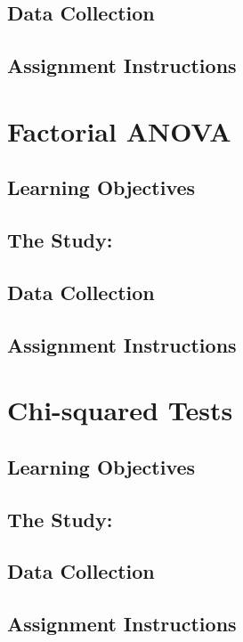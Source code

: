 \documentclass[
]{book}
\begin{document}
\hypertarget{anova-data}{%
\section{Data Collection}\label{anova-data}}

\hypertarget{anova-assignment}{%
\section{Assignment Instructions}\label{anova-assignment}}

\hypertarget{fanova}{%
\chapter{Factorial ANOVA}\label{fanova}}

\hypertarget{fanova-learning-objectives}{%
\section{Learning Objectives}\label{fanova-learning-objectives}}

\hypertarget{fanova-study}{%
\section{The Study:}\label{fanova-study}}

\hypertarget{fanova-data}{%
\section{Data Collection}\label{fanova-data}}

\hypertarget{fanova-assignment}{%
\section{Assignment Instructions}\label{fanova-assignment}}

\hypertarget{chisq}{%
\chapter{Chi-squared Tests}\label{chisq}}

\hypertarget{chisq-learning-objectives}{%
\section{Learning Objectives}\label{chisq-learning-objectives}}

\hypertarget{chisq-study}{%
\section{The Study:}\label{chisq-study}}

\hypertarget{chisq-data}{%
\section{Data Collection}\label{chisq-data}}

\hypertarget{chisq-assignment}{%
\section{Assignment Instructions}\label{chisq-assignment}}

  
\end{document}
